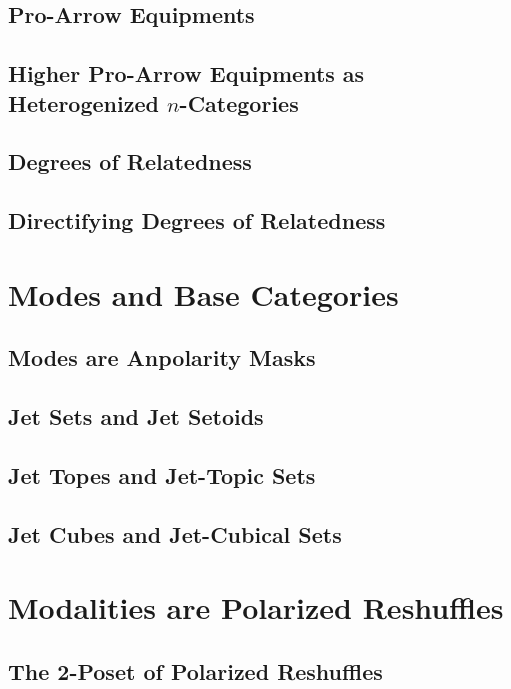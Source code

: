\documentclass{lmcs} %
\theoremstyle{plain}\newtheorem{satz}[thm]{Satz} %
\theoremstyle{plain}
\theoremstyle{definition}
\begin{document}
\subsection{Pro-Arrow Equipments}

\subsection{Higher Pro-Arrow Equipments as Heterogenized $n$-Categories}

\subsection{Degrees of Relatedness}

\subsection{Directifying Degrees of Relatedness}

\section{Modes and Base Categories}

\subsection{Modes are Anpolarity Masks}

\subsection{Jet Sets and Jet Setoids}

\subsection{Jet Topes and Jet-Topic Sets}

\subsection{Jet Cubes and Jet-Cubical Sets}

\section{Modalities are Polarized Reshuffles}

\subsection{The 2-Poset of Polarized Reshuffles}
\end{document}
